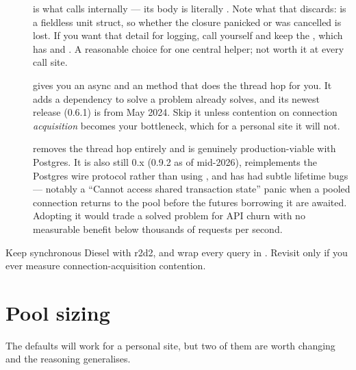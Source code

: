 \begin{description}
  \item[] is what  calls internally --- its
    body is literally .
    Note what that  discards:  is a fieldless unit struct, so
    whether the closure panicked or was cancelled is lost. If you want that detail for logging,
    call  yourself and keep the , which has
     and . A reasonable choice for one central helper; not
    worth it at every call site.

  \item[] gives you an async  and an 
    method that does the thread hop for you. It adds a dependency to solve a problem
     already solves, and its newest release (0.6.1) is from May 2024. Skip it
    unless contention on connection \emph{acquisition} becomes your bottleneck, which for a
    personal site it will not.

  \item[] removes the thread hop entirely and is genuinely production-viable
    with Postgres. It is also still 0.x (0.9.2 as of mid-2026), reimplements the Postgres wire
    protocol rather than using , and has had subtle lifetime bugs --- notably a
    ``Cannot access shared transaction state'' panic when a pooled connection returns to the pool
    before the futures borrowing it are awaited. Adopting it would trade a solved problem for API
    churn with no measurable benefit below thousands of requests per second.
\end{description}

\begin{pattern}
Keep synchronous Diesel with r2d2, and wrap every query in . Revisit only if you
ever measure connection-acquisition contention.
\end{pattern}

\section{Pool sizing}

The defaults will work for a personal site, but two of them are worth changing and the reasoning
generalises.

